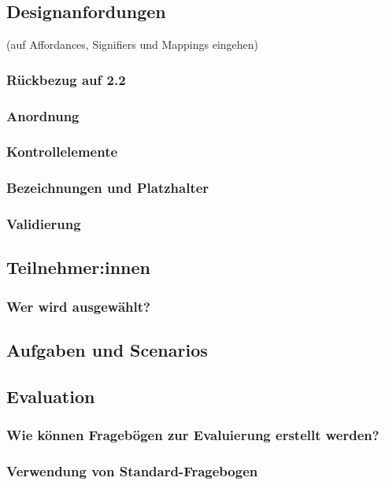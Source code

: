 \documentclass[a4paper, 12pt, oneside, BCOR=1cm,toc=chapterentrywithdots]{scrbook}
\begin{document}
\subsection{Designanfordungen}
\cite{normanDesignEveryday2013} (auf Affordances, Signifiers und Mappings eingehen)
\subsubsection{Rückbezug auf 2.2}
\subsubsection{Anordnung}
\subsubsection{Kontrollelemente}
\subsubsection{Bezeichnungen und Platzhalter}
\subsubsection{Validierung}

\clearpage


\subsection{Teilnehmer:innen}
\subsubsection{Wer wird ausgewählt?}
\subsection{Aufgaben und Scenarios}
\subsection{Evaluation}
\subsubsection{Wie können Fragebögen zur Evaluierung erstellt werden?}
\subsubsection{Verwendung von Standard-Fragebogen}
\end{document}
